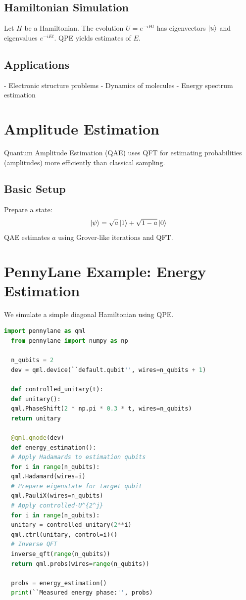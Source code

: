 \documentclass[12pt]{book}
\begin{document}
\subsection*{Hamiltonian Simulation}
Let $H$ be a Hamiltonian. The evolution $U = e^{-iHt}$ has eigenvectors $\ket{u}$ and eigenvalues $e^{-iEt}$. QPE yields estimates of $E$.

\subsection*{Applications}
- Electronic structure problems
- Dynamics of molecules
- Energy spectrum estimation

\section{Amplitude Estimation}
Quantum Amplitude Estimation (QAE) uses QFT for estimating probabilities (amplitudes) more efficiently than classical sampling.

\subsection*{Basic Setup}
Prepare a state:
\[
\ket{\psi} = \sqrt{a}\ket{1} + \sqrt{1 - a}\ket{0}
\]
QAE estimates $a$ using Grover-like iterations and QFT.

\section{PennyLane Example: Energy Estimation}
We simulate a simple diagonal Hamiltonian using QPE.

\begin{lstlisting}[language=Python]
  import pennylane as qml
  from pennylane import numpy as np

  n_qubits = 2
  dev = qml.device(``default.qubit'', wires=n_qubits + 1)

  def controlled_unitary(t):
  def unitary():
  qml.PhaseShift(2 * np.pi * 0.3 * t, wires=n_qubits)
  return unitary

  @qml.qnode(dev)
  def energy_estimation():
  # Apply Hadamards to estimation qubits
  for i in range(n_qubits):
  qml.Hadamard(wires=i)
  # Prepare eigenstate for target qubit
  qml.PauliX(wires=n_qubits)
  # Apply controlled-U^{2^j}
  for i in range(n_qubits):
  unitary = controlled_unitary(2**i)
  qml.ctrl(unitary, control=i)()
  # Inverse QFT
  inverse_qft(range(n_qubits))
  return qml.probs(wires=range(n_qubits))

  probs = energy_estimation()
  print(``Measured energy phase:'', probs)
\end{lstlisting}
\end{document}
